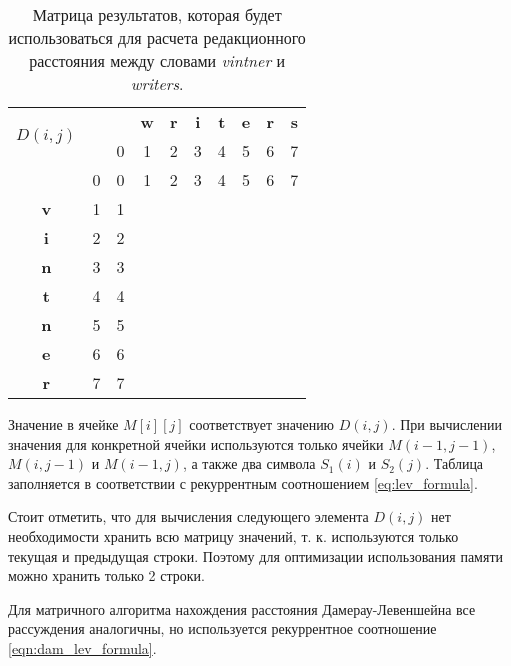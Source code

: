 \begin{table}[htb]
\caption{\centering Матрица результатов, которая будет использоваться для расчета редакционного расстояния между словами \textit{vintner} и \textit{writers}.}
\small
\centering\begin{tabular}{|c|c|c|c|c|c|c|c|c|c|}
    \hline
    \multirow{2}{*}{$D(i,j)$} & \multirow{2}{*}{} & \multirow{1}{*}{} & \multirow{1}{*}{\textbf{w}} & \multirow{1}{*}{\textbf{r}} & \multirow{1}{*}{\textbf{i}} & \multirow{1}{*}{\textbf{t}} & \multirow{1}{*}{\textbf{e}} & \multirow{1}{*}{\textbf{r}} & \multirow{1}{*}{\textbf{s}} \\ \cline{3-10}
    & & 0 & 1 & 2 & 3 & 4 & 5 & 6 & 7 \\ \hline
    & 0 & 0 & 1 & 2 & 3 & 4 & 5 & 6 & 7 \\ \hline
    \textbf{v} & 1 & 1 & & & & & & & \\ \hline
    \textbf{i} & 2 & 2 & & & & & & & \\ \hline
    \textbf{n} & 3 & 3 & & & & & & & \\ \hline
    \textbf{t} & 4 & 4 & & & & & & & \\ \hline
    \textbf{n} & 5 & 5 & & & & & & & \\ \hline
    \textbf{e} & 6 & 6 & & & & & & & \\ \hline
    \textbf{r} & 7 & 7 & & & & & & & \\ \hline
\end{tabular}
\label{table:matrix}
\end{table}

Значение в ячейке \(M[i][j]\) соответствует значению \(D(i, j)\). При вычислении значения для конкретной ячейки используются только ячейки \(M(i - 1, j - 1)\), \(M(i, j - 1)\) и \(M(i - 1, j)\), а также два символа \(S_1(i)\) и \(S_2(j)\). Таблица заполняется в соответствии с рекуррентным соотношением \ref{eq:lev_formula}.

Стоит отметить, что для вычисления следующего элемента \(D(i, j)\) нет необходимости хранить всю матрицу значений, т. к. используются только текущая и предыдущая строки. Поэтому для оптимизации использования памяти можно хранить только 2 строки.

Для матричного алгоритма нахождения расстояния Дамерау-Левеншейна все рассуждения аналогичны, но используется рекуррентное соотношение \ref{eqn:dam_lev_formula}.
